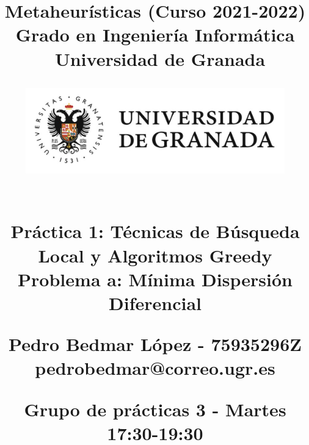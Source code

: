 



\title{	
\normalfont \normalsize 
\huge{\textbf{Metaheurísticas (Curso 2021-2022)} \newline \newline Grado en Ingeniería Informática \\ Universidad de Granada} \\ [23pt] %

\begin{figure}[H] %
    \centering
        \includegraphics[scale=0.4]{img/ugr.png}
\end{figure}

\horrule{0.5pt} \\[0.4cm] %
\huge Práctica 1: Técnicas de Búsqueda Local y Algoritmos Greedy \linebreak \linebreak%
\LARGE Problema a: Mínima Dispersión Diferencial
\horrule{2pt} \\[0.5cm] %
\vspace{0.7cm}

\Large{Pedro Bedmar López - 75935296Z}
\Large{pedrobedmar@correo.ugr.es} \linebreak

\large Grupo de prácticas 3 - Martes 17:30-19:30

}

\date{}




